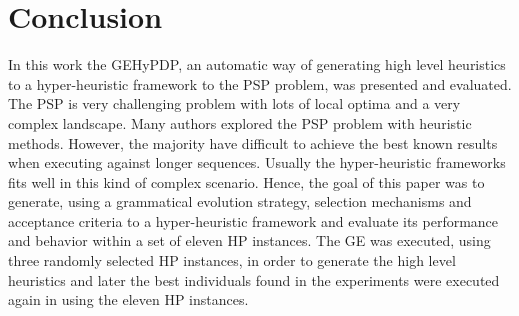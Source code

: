 \documentclass[conference]{IEEEtran}
\begin{document}
%






\section{Conclusion}
\label{sec:conclusion}
In this work the GEHyPDP, an automatic way of generating high level heuristics to a hyper-heuristic framework to the PSP problem, was presented and evaluated. The PSP is very challenging problem  with lots of local optima and a very complex landscape. Many authors explored the PSP problem with heuristic methods. However, the majority have difficult to achieve the best known results when executing against longer sequences. Usually the hyper-heuristic frameworks fits well in this kind of complex scenario. Hence, the goal of this paper was to generate, using a grammatical evolution strategy, selection mechanisms and acceptance criteria to a hyper-heuristic framework and evaluate its performance and behavior within a set of eleven HP instances. The GE was executed, using three randomly selected HP instances, in order to generate the high level heuristics and later the best individuals found in the experiments were executed again in using the eleven HP instances. 
\end{document}
